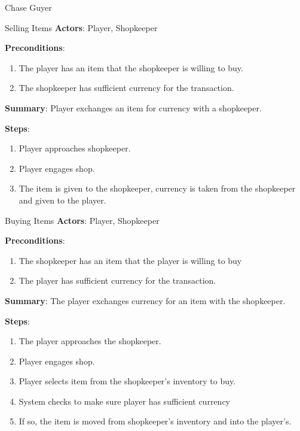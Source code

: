 \documentclass[12pt]{report}
\begin{document}
\begin{section}{Chase Guyer}

\begin{subsection}{Selling Items}
\textbf{Actors}:
Player, Shopkeeper

\textbf{Preconditions}:
\begin{enumerate}
\item The player has an item that the shopkeeper is willing to buy.
\item The shopkeeper has sufficient currency for the transaction.
\end{enumerate}

\textbf{Summary}:
Player exchanges an item for currency with a shopkeeper.

\textbf{Steps}:
\begin{enumerate}
\item Player approaches shopkeeper.
\item Player engages shop.
\item The item is given to the shopkeeper, currency is taken from the shopkeeper
and given to the player.
\end{enumerate}
\end{subsection}

\begin{subsection}{Buying Items}
\textbf{Actors}:
Player, Shopkeeper

\textbf{Preconditions}:
\begin{enumerate}
\item The shopkeeper has an item that the player is willing to buy
\item The player has sufficient currency for the transaction.
\end{enumerate}

\textbf{Summary}:
The player exchanges currency for an item with the shopkeeper.

\textbf{Steps}:
\begin{enumerate}
\item The player approaches the shopkeeper.
\item Player engages shop.
\item Player selects item from the shopkeeper's inventory to buy.
\item System checks to make sure player has sufficient currency
\item If so, the item is moved from shopkeeper's inventory and into the player's.
\end{enumerate}
\end{subsection}


\end{section}
\end{document}
